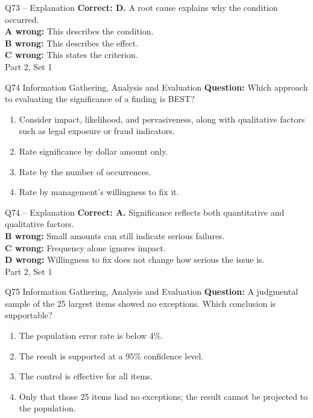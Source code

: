 \documentclass[aspectratio=169,10pt]{beamer}
\begin{document}
\begin{frame}[t]{Q73 -- Explanation}
	\footnotesize
	\textbf{Correct: D.} A root cause explains why the condition occurred. \\[5pt]
\textbf{A wrong:} This describes the condition. \\[3pt]
\textbf{B wrong:} This describes the effect. \\[3pt]
\textbf{C wrong:} This states the criterion. \\[3pt]
	\vfill {\tiny Part 2, Set 1}
\end{frame}
\begin{frame}[t]{Q74 \hfill {\scriptsize Information Gathering, Analysis and Evaluation}}
	\small
	\textbf{Question:} Which approach to evaluating the significance of a finding is BEST?
	\begin{enumerate}[label=\Alph*.,itemsep=1pt,topsep=3pt]
			\item Consider impact, likelihood, and pervasiveness, along with qualitative factors such as legal exposure or fraud indicators.
			\item Rate significance by dollar amount only.
			\item Rate by the number of occurrences.
			\item Rate by management's willingness to fix it.
	\end{enumerate}
\end{frame}
\begin{frame}[t]{Q74 -- Explanation}
	\footnotesize
	\textbf{Correct: A.} Significance reflects both quantitative and qualitative factors. \\[5pt]
\textbf{B wrong:} Small amounts can still indicate serious failures. \\[3pt]
\textbf{C wrong:} Frequency alone ignores impact. \\[3pt]
\textbf{D wrong:} Willingness to fix does not change how serious the issue is. \\[3pt]
	\vfill {\tiny Part 2, Set 1}
\end{frame}
\begin{frame}[t]{Q75 \hfill {\scriptsize Information Gathering, Analysis and Evaluation}}
	\small
	\textbf{Question:} A judgmental sample of the 25 largest items showed no exceptions. Which conclusion is supportable?
	\begin{enumerate}[label=\Alph*.,itemsep=1pt,topsep=3pt]
			\item The population error rate is below 4\%.
			\item The result is supported at a 95\% confidence level.
			\item The control is effective for all items.
			\item Only that those 25 items had no exceptions; the result cannot be projected to the population.
	\end{enumerate}
\end{frame}
\end{document}
